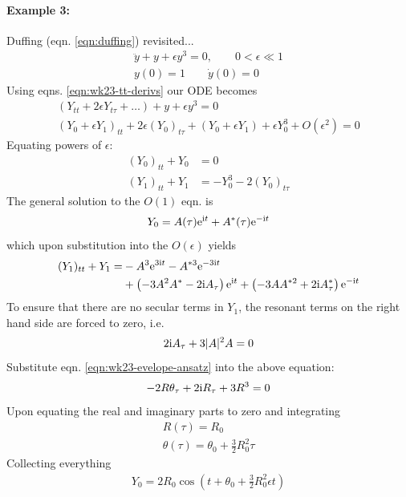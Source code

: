 \paragraph{Example 3:} Duffing (eqn. \ref{eqn:duffing}) revisited...
\begin{gather*}
\ddot{y} + y + \epsilon y^3 = 0, \qquad 0 < \epsilon \ll 1 \\
y(0) = 1 \qquad \dot y(0) = 0 \nonumber 
\end{gather*}
Using eqns. \ref{eqn:wk23-tt-derivs} our ODE becomes
\begin{gather*}
(Y_{tt} + 2\epsilon Y_{t\tau} + \dots ) + y + \epsilon y^3 = 0 \\
(Y_0 + \epsilon Y_1 )_{tt} + 2\epsilon (Y_0)_{t\tau} + (Y_0 + \epsilon Y_1) + \epsilon Y_0^3 + O(\epsilon^2) = 0
\end{gather*}
Equating powers of $\epsilon$:
\begin{align*}
(Y_0)_{tt} + Y_0 &= 0 \\
(Y_1)_{tt} + Y_1 &= -Y_0^3 -2 (Y_0)_{t\tau}
\end{align*}
The general solution to the $O(1)$ eqn. is
\begin{gather*}
Y_0 = A(\tau) \mathrm{e}^{\mathrm{i} t} + A^\ast (\tau) \mathrm{e}^{-\mathrm{i} t}
\end{gather*}
which upon substitution into the $O(\epsilon)$ yields
\begin{align*}
(Y_1)_{tt} + Y_1 =& -A^3 \mathrm{e}^{3\mathrm{i} t} - A^{\ast 3}\mathrm{e}^{-3\mathrm{i} t} \\
&+ \left( -3A^2 A^\ast - 2\mathrm{i} A_\tau \right) \mathrm{e}^{\mathrm{i} t} + \left(-3 A A^{\ast 2} + 2\mathrm{i}  A^\ast_ \tau \right) \mathrm{e}^{-\mathrm{i} t}
\end{align*}
To ensure that there are no secular terms in $Y_1$, the resonant terms on the right hand side are forced to zero, i.e.
\begin{gather*}
2 \mathrm{i} A_\tau + 3 |A|^2 A = 0 
\end{gather*}
Substitute eqn. \ref{eqn:wk23-evelope-ansatz} into the above equation:
\begin{gather*}
-2 R \theta_\tau + 2 \mathrm{i} R_\tau + 3 R^3 = 0
\end{gather*}
Upon equating the real and imaginary parts to zero and integrating
\begin{gather*}
R(\tau) = R_0 \\
\theta(\tau) = \theta_0 + \frac{3}{2} R^2_0  \tau
\end{gather*}
Collecting everything
\begin{gather*}
Y_0 = 2 R_0 \cos \left(t + \theta_0 + \frac{3}{2} R_0^2 \epsilon t\right)
\end{gather*}
